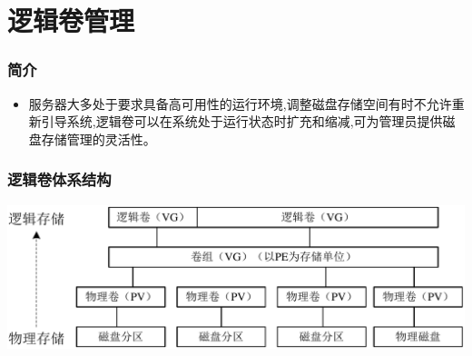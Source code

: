 \documentclass[xcolor=svgnames,presentation]{beamer}
\begin{document}
\section{逻辑卷管理}
\label{sec-5}
\begin{frame}
\frametitle{简介}
\label{sec-5-1}
\begin{itemize}

\item 服务器大多处于要求具备高可用性的运行环境,调整磁盘存储空间有时不允许重新引导系统,逻辑卷可以在系统处于运行状态时扩充和缩减,可为管理员提供磁盘存储管理的灵活性。
\label{sec-5-1-1}%
\end{itemize} %
\end{frame}
\begin{frame}
\frametitle{逻辑卷体系结构}
\label{sec-5-2}

\includegraphics[width=.9\linewidth]{img/lvm.png}
\end{frame}
\end{document}
